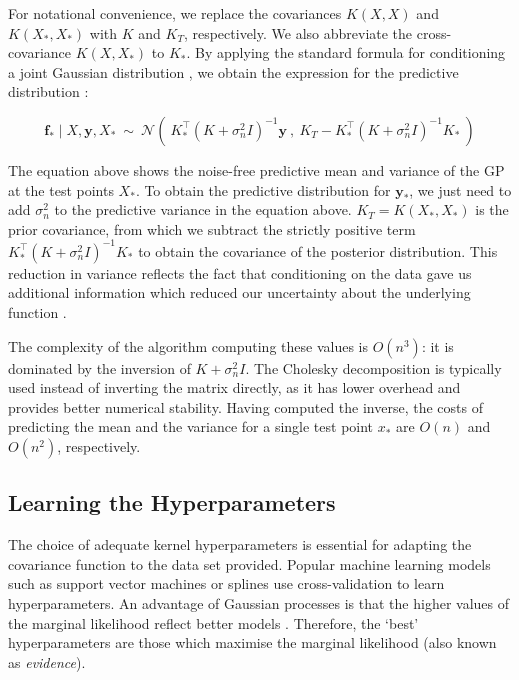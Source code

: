 \documentclass[a4paper,12pt ]{report}
\renewcommand{\GP}{{GP}}
\begin{document}
For notational convenience, we replace the covariances $K(X, X)$ and $K(X_{*}, X_{*})$ with $K$ and $K_{T}$, respectively. We also abbreviate the cross-covariance $K(X, X_{*})$ to $K_{*}$. By applying the standard formula for conditioning a joint Gaussian distribution \cite{rasmussenGPs}, we obtain the expression for the predictive distribution \cite{rasmussen06}:

\begin{equation*} \mathbf{f_{*}} \mid X, \mathbf{y}, X_{*}  ~ \sim ~ \mathcal{N}\left( ~ K_{*}^{\top} ( K + \sigma_n^2I)^{-1} \mathbf{y} ~,~ K_{T} - K_{*}^{\top}( K + \sigma_n^2I)^{-1} K_{*}   ~ \right) \end{equation*}

The equation above shows the noise-free predictive mean and variance of the {\GP} at the test points $X_{*}$. To obtain the predictive distribution for $\mathbf{y_{*}}$, we just need to add $\sigma_n^2$ to the predictive variance in the equation above. $ K_{T} = K(X_{*}, X_{*}) $ is the prior covariance, from which we subtract the strictly positive term $K_{*}^{\top}( K + \sigma_n^2I)^{-1} K_{*}$ to obtain the covariance of the posterior distribution. This reduction in variance reflects the fact that conditioning on the data gave us additional information which reduced our uncertainty about the underlying function \cite{rasmussen06}.

The complexity of the algorithm computing these values is $O(n^3)$: it is dominated by the inversion of $ K + \sigma_n^2I$. The Cholesky decomposition is typically used instead of inverting the matrix directly, as it has lower overhead and provides better numerical stability. Having computed the inverse, the costs of predicting the mean and the variance for a single test point $x_{*}$ are $O(n)$ and $O(n^2)$, respectively.


\subsection{Learning the Hyperparameters}

The choice of adequate kernel hyperparameters is essential for adapting the covariance function to the data set provided. Popular machine learning models such as support vector machines or splines use cross-validation to learn hyperparameters. An advantage of Gaussian processes is that the higher values of the marginal likelihood reflect better models \cite{zoubinoccam, rasmussen06, rasmussenGPs}. Therefore, the `best' hyperparameters are those which maximise the marginal likelihood (also known as \emph{evidence}).
\end{document}

